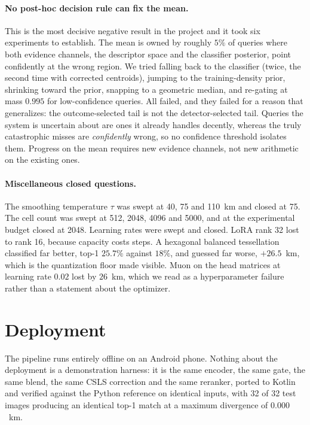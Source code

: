 \documentclass[11pt,a4paper]{article}
\begin{document}
\paragraph{No post-hoc decision rule can fix the mean.} This is the most decisive negative
result in the project and it took six experiments to establish. The mean is owned by roughly
$5\%$ of queries where both evidence channels, the descriptor space and the classifier
posterior, point confidently at the wrong region. We tried falling back to the classifier
(twice, the second time with corrected centroids), jumping to the training-density prior,
shrinking toward the prior, snapping to a geometric median, and re-gating at mass $0.995$ for
low-confidence queries. All failed, and they failed for a reason that generalizes: the
outcome-selected tail is not the detector-selected tail. Queries the system is uncertain about
are ones it already handles decently, whereas the truly catastrophic misses are
\emph{confidently} wrong, so no confidence threshold isolates them. Progress on the mean
requires new evidence channels, not new arithmetic on the existing ones.

\paragraph{Miscellaneous closed questions.} The smoothing temperature $\tau$ was swept at
40, 75 and 110~km and closed at 75. The cell count was swept at 512, 2048, 4096 and
5000, and at the experimental budget closed at 2048. Learning rates were
swept and closed. LoRA rank 32 lost to rank 16, because capacity costs steps. A hexagonal
balanced tessellation classified far better, top-1 $25.7\%$ against $18\%$, and guessed far
worse, $+26.5$~km, which is the quantization floor made visible. Muon \cite{jordan2024muon}
on the head matrices at learning rate $0.02$ lost by $26$~km, which we read as a
hyperparameter failure rather than a statement about the optimizer.

\section{Deployment}

The pipeline runs entirely offline on an Android phone. Nothing about the deployment is a
demonstration harness: it is the same encoder, the same gate, the same blend, the same CSLS
correction and the same reranker, ported to Kotlin and verified against the Python reference
on identical inputs, with 32 of 32 test images producing an identical top-1 match at a maximum
divergence of $0.000$~km.
\end{document}
